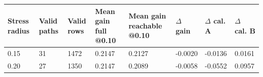 \begin{tabular}{llllllll}
\toprule
Stress radius & Valid paths & Valid rows & Mean gain full @0.10 & Mean gain reachable @0.10 & $\Delta$ gain & $\Delta$ cal. A & $\Delta$ cal. B \\
\midrule
0.15 & 31 & 1472 & 0.2147 & 0.2127 & -0.0020 & -0.0136 & 0.0161 \\
0.20 & 27 & 1350 & 0.2147 & 0.2089 & -0.0058 & -0.0552 & 0.0957 \\
\bottomrule
\end{tabular}
